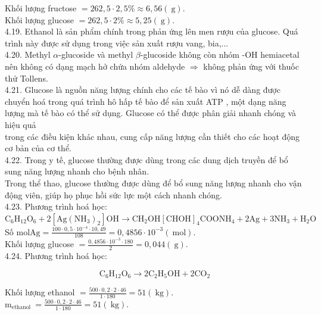\documentclass[10pt]{article}
\begin{document}
Khối lượng fructose $=262,5 \cdot 2,5 \% \approx 6,56(\mathrm{~g})$.\\
Khối lượng glucose $=262,5 \cdot 2 \% \approx 5,25(\mathrm{~g})$.\\
4.19. Ethanol là sản phẩm chính trong phản ứng lên men rượu của glucose. Quá trình này được sử dụng trong việc sản xuất rượu vang, bia,...\\
4.20. Methyl $\alpha$-glucoside và methyl $\beta$-glucoside không còn nhóm -OH hemiacetal nên không có dạng mạch hở chứa nhóm aldehyde $\Rightarrow$ không phản ứng với thuốc thử Tollens.\\
4.21. Glucose là nguồn năng lượng chính cho các tế bào vì nó dễ dàng được chuyển hoá trong quá trình hô hấp tế bào để sản xuất ATP , một dạng năng lượng mà tế bào có thể sử dụng. Glucose có thể được phân giải nhanh chóng và hiệu quả\\
trong các điều kiện khác nhau, cung cấp năng lượng cần thiết cho các hoạt động cơ bản của cơ thể.\\
4.22. Trong y tế, glucose thường được dùng trong các dung dịch truyền để bổ sung năng lượng nhanh cho bệnh nhân.\\
Trong thể thao, glucose thường được dùng để bổ sung năng lượng nhanh cho vận động viên, giúp họ phục hồi sức lực một cách nhanh chóng.\\
4.23. Phương trình hoá học:\\
$\mathrm{C}_{6} \mathrm{H}_{12} \mathrm{O}_{6}+2\left[\mathrm{Ag}\left(\mathrm{NH}_{3}\right)_{2}\right] \mathrm{OH} \rightarrow \mathrm{CH}_{2} \mathrm{OH}[\mathrm{CHOH}]_{4} \mathrm{COONH}_{4}+2 \mathrm{Ag}+3 \mathrm{NH}_{3}+\mathrm{H}_{2} \mathrm{O}$\\
Số $\mathrm{mol} \mathrm{Ag}=\frac{100 \cdot 0,5 \cdot 10^{-4} \cdot 10,49}{108}=0,4856 \cdot 10^{-3}(\mathrm{~mol})$.\\
Khối lượng glucose $=\frac{0,4856 \cdot 10^{-3} \cdot 180}{2}=0,044(\mathrm{~g})$.\\
4.24. Phương trình hoá học:

$$
\mathrm{C}_{6} \mathrm{H}_{12} \mathrm{O}_{6} \rightarrow 2 \mathrm{C}_{2} \mathrm{H}_{5} \mathrm{OH}+2 \mathrm{CO}_{2}
$$

Khối lượng ethanol $=\frac{500 \cdot 0,2 \cdot 2 \cdot 46}{1 \cdot 180}=51(\mathrm{~kg})$.\\
$\mathrm{m}_{\text {ethanol }}=\frac{500 \cdot 0,2 \cdot 2 \cdot 46}{1 \cdot 180}=51(\mathrm{~kg})$.
\end{document}
